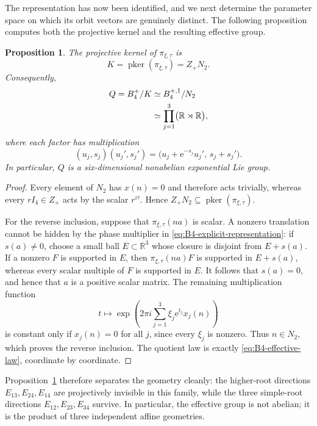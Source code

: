 \documentclass[10pt,a4paper]{amsart}
\numberwithin{equation}{section}
\newtheorem{proposition}[theorem]{Proposition}
\newcommand{\R}{\mathbb R}
\newcommand{\pker}{\operatorname{pker}}
\newcommand{\e}{\mathrm e}
\begin{document}
The representation has now been identified, and we next determine the
parameter space on which its orbit vectors are genuinely distinct.  The
following proposition computes both the projective kernel and the resulting
effective group.

\begin{proposition}
\label{prop:B4-projective-kernel}
The projective kernel of $\pi_{\xi,\tau}$ is
\begin{equation}
 K=\pker(\pi_{\xi,\tau})=Z_+N_2.
 \label{eq:B4-projective-kernel}
\end{equation}
Consequently,
\begin{align}
 Q=B_4^+/K
 &\simeq B_4^{+,1}/N_2 \notag\\
 &\simeq\prod_{j=1}^3\bigl(\R\rtimes\R\bigr),
 \label{eq:B4-effective-quotient}
\end{align}
where each factor has multiplication
\begin{equation}
 (u_j,s_j)(u_j',s_j')
 =\bigl(u_j+\e^{-s_j}u_j',\,s_j+s_j'\bigr).
 \label{eq:B4-affine-law}
\end{equation}
In particular, $Q$ is a six-dimensional nonabelian exponential Lie group.
\end{proposition}

\begin{proof}
Every element of $N_2$ has $x(n)=0$ and therefore acts trivially, whereas
every $rI_4\in Z_+$ acts by the scalar $r^{i\tau}$.  Hence
$Z_+N_2\subseteq\pker(\pi_{\xi,\tau})$.

For the reverse inclusion, suppose that $\pi_{\xi,\tau}(na)$ is scalar.
A nonzero translation cannot be hidden by the phase multiplier in
\eqref{eq:B4-explicit-representation}: if $s(a)\neq0$, choose a small ball
$E\subset\R^3$ whose closure is disjoint from $E+s(a)$.  If a nonzero $F$
is supported in $E$, then $\pi_{\xi,\tau}(na)F$ is supported in $E+s(a)$,
whereas every scalar multiple of $F$ is supported in $E$.  It follows that
$s(a)=0$, and hence that $a$ is a positive scalar matrix.  The remaining
multiplication function
\[
 t\longmapsto
 \exp\left(2\pi i\sum_{j=1}^3\xi_j\e^{t_j}x_j(n)\right)
\]
is constant only if $x_j(n)=0$ for all $j$, since every $\xi_j$ is nonzero.
Thus $n\in N_2$, which proves the reverse inclusion.  The quotient law is
exactly \eqref{eq:B4-effective-law}, coordinate by coordinate.
\end{proof}

Proposition~\ref{prop:B4-projective-kernel} therefore separates the geometry
cleanly: the higher-root directions $E_{13},E_{24},E_{14}$ are projectively
invisible in this family, while the three simple-root directions
$E_{12},E_{23},E_{34}$ survive.  In particular, the effective group is not
abelian; it is the product of three independent affine geometries.
\end{document}
